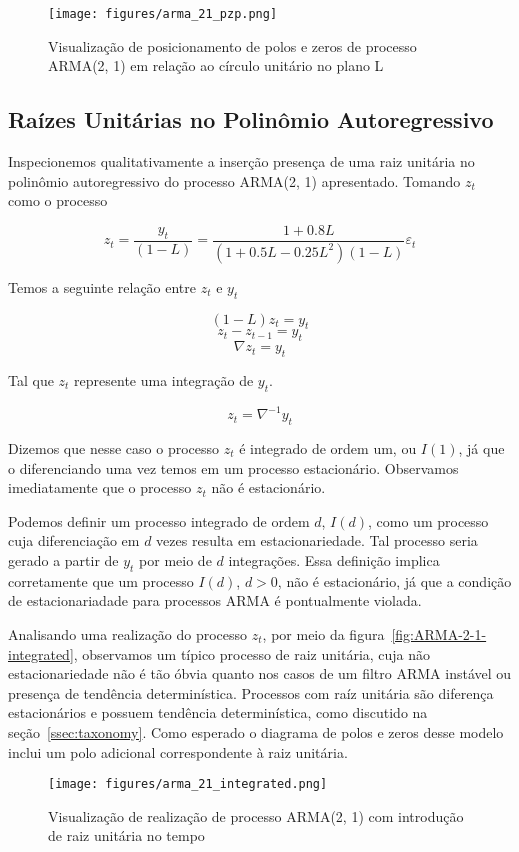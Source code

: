 \begin{figure}[H]
    \centering
    \texttt{[image: figures/arma\_21\_pzp.png]}
    \caption{Visualização de posicionamento de polos e zeros de processo
    ARMA(2, 1) em relação ao
    círculo unitário no plano L}
    \label{fig:ARMA2-1-pzp}
\end{figure}

\subsection{Raízes Unitárias no Polinômio Autoregressivo}

Inspecionemos qualitativamente a inserção presença de uma raiz unitária no
polinômio autoregressivo do processo ARMA(2, 1) apresentado. Tomando $z_t$
como o processo

$$ z_t = \frac{y_t}{(1 - L)} = \frac{1 + 0.8L}{(1 + 0.5 L - 0.25 L^2)(1 - L)} \varepsilon_t $$

Temos a seguinte relação entre $z_t$ e $y_t$

$$ (1 - L)z_t = y_t $$
$$ z_t - z_{t-1} = y_t $$
$$ \nabla z_t = y_t $$

Tal que $z_t$ represente uma integração de $y_t$.

$$ z_t = \nabla^{-1} y_t $$

Dizemos que nesse caso o processo $z_t$ é integrado de ordem um, ou $I(1)$, já
que o diferenciando uma vez temos em um processo estacionário. Observamos
imediatamente que o processo $z_t$ não é estacionário.

Podemos definir um processo integrado de ordem $d$, $I(d)$, como um processo
cuja diferenciação em $d$ vezes resulta em estacionariedade. Tal processo seria
gerado a partir de $y_t$ por meio de $d$ integrações. Essa definição implica
corretamente que um processo $I(d)$, $d > 0$, não é estacionário, já que a
condição de estacionariadade para processos ARMA é pontualmente violada.

Analisando uma realização do processo $z_t$, por meio da
figura~\ref{fig:ARMA-2-1-integrated}, observamos um típico processo de raiz
unitária, cuja não estacionariedade não é tão óbvia quanto nos casos de um
filtro ARMA instável ou presença de tendência determinística. Processos com
raíz unitária são diferença estacionários e possuem tendência determinística,
como discutido na seção~\ref{ssec:taxonomy}. Como esperado o diagrama de
polos e zeros desse modelo inclui um polo adicional correspondente à raiz
unitária.

\begin{figure}[H]
    \centering
    \texttt{[image: figures/arma\_21\_integrated.png]}
    \caption{Visualização de realização de processo ARMA(2, 1) com introdução
    de raiz unitária no tempo}
    \label{fig:ARMA2-1-integrated}
\end{figure}

